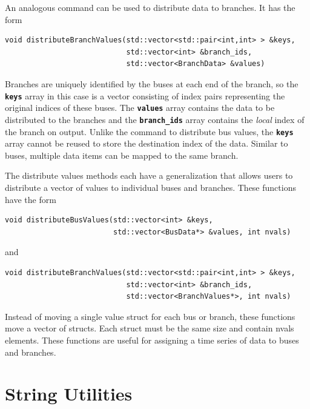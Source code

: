 \documentclass[12pt]{report} %
\begin{document}
An analogous command can be used to distribute data to branches. It has the form

{
\color{red}
\begin{Verbatim}[fontseries=b]
void distributeBranchValues(std::vector<std::pair<int,int> > &keys,
                            std::vector<int> &branch_ids,
                            std::vector<BranchData> &values)
\end{Verbatim}
}

Branches are uniquely identified by the buses at each end of the branch, so the \texttt{\textbf{keys}} array in this case is a vector consisting of index pairs representing the original indices of these buses. The \texttt{\textbf{values}} array contains the data to be distributed to the branches and the \texttt{\textbf{branch\_ids}} array contains the \textit{local} index of the branch on output. Unlike the command to distribute bus values, the \texttt{\textbf{keys}} array cannot be reused to store the destination index of the data. Similar to buses, multiple data items can be mapped to the same branch.

The distribute values methods each have a generalization that allows users to distribute a vector of values to individual buses and branches. These functions have the form

{
\color{red}
\begin{Verbatim}[fontseries=b]
void distributeBusValues(std::vector<int> &keys,
                         std::vector<BusData*> &values, int nvals)
\end{Verbatim}
}

and

{
\color{red}
\begin{Verbatim}[fontseries=b]
void distributeBranchValues(std::vector<std::pair<int,int> > &keys,
                            std::vector<int> &branch_ids,
                            std::vector<BranchValues*>, int nvals)
\end{Verbatim}
}

Instead of moving a single value struct for each bus or branch, these functions move a vector of structs. Each struct must be the same size and contain nvals elements. These functions are useful for assigning a time series of data to buses and branches.

\section{String Utilities}
\end{document}
